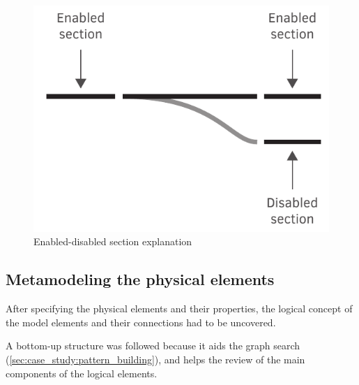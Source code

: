 \begin{figure}[h]
	\centering
	\includegraphics[width=0.5\linewidth]{include/figures/chapter_6/metamodel_switch_endi}
	\caption{Enabled-disabled section explanation}
	\label{fig:case_study:metamodel_switch_endi}
\end{figure}

\subsection{Metamodeling the physical elements}
\label{sec:case_study:logical_breakdown}
After specifying the physical elements and their properties, the logical concept of the model elements and their connections had to be uncovered.

A bottom-up structure was followed because it aids the graph search (\cref{sec:case_study:pattern_building}), and helps the review of the main components of the logical elements.

